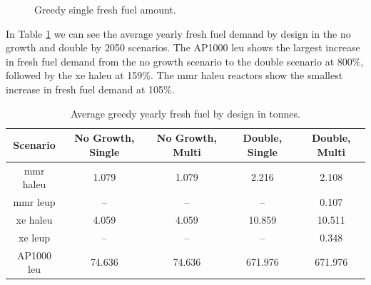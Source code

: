 

\begin{figure}[H]
  \hfill
  \caption{Greedy single fresh fuel amount.}
  \label{fig:greedy_of_fresh}
\end{figure}

In Table \ref{tab:greedy_fresh_avg} we can see the average yearly fresh fuel demand by design in the no growth and double by 2050 scenarios. The AP1000 \gls{leu} shows the largest increase in fresh fuel demand from the no growth scenario to the double scenario at 800\%, followed by the \gls{xe} \gls{haleu} at 159\%. The \gls{mmr} \gls{haleu} reactors show the smallest increase in fresh fuel demand at 105\%.


\begin{table}[H]
  \centering
  \caption{Average greedy yearly fresh fuel by design in tonnes.}
  \label{tab:greedy_fresh_avg}
  \begin{tabular}{c c c c c}
     \hline
     Scenario & No Growth, Single & No Growth, Multi & Double, Single & Double, Multi  \\
     \hline
     \gls{mmr} \gls{haleu}   & 1.079    & 1.079   & 2.216    & 2.108    \\
     \gls{mmr} \gls{leup}    & --       & --      & --       & 0.107    \\
     \gls{xe} \gls{haleu}    & 4.059    & 4.059   & 10.859   & 10.511   \\
     \gls{xe} \gls{leup}     & --       & --      & --       & 0.348    \\
     AP1000 \gls{leu}        & 74.636   & 74.636  & 671.976  & 671.976  \\
     \hline
  \end{tabular}
\end{table}




